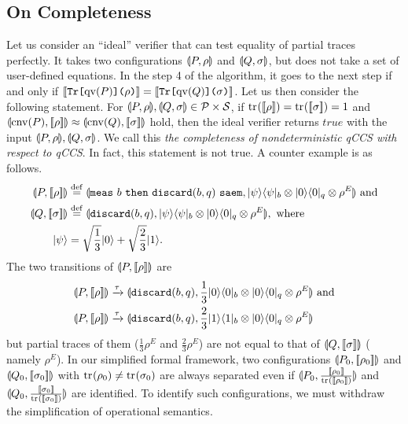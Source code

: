 \subsection{On Completeness}
Let us consider an ``ideal'' verifier that can test
equality of partial traces perfectly.
It takes two configurations
$\llparenthesis P, \rho \rrparenthesis$ and $\llparenthesis Q, \sigma \rrparenthesis$, but does not take a
set of user-defined equations. In the step 4 of the algorithm,
it goes to the next step 
if and only if $[\![\texttt{Tr[}\mathrm{qv}(P)\texttt{](}\rho\texttt{)}]\!] =
[\![\texttt{Tr[}\mathrm{qv}(Q)\texttt{](}\sigma\texttt{)}]\!]$.
Let us then consider the following statement.
For $\llparenthesis P, \rho \rrparenthesis,\llparenthesis Q, \sigma \rrparenthesis \in \mathcal{P} \times \mathcal{S}$,
if ${\rm tr}_{}([\![\rho]\!])={\rm tr}_{}([\![\sigma]\!])=1$ and
$\llparenthesis \mathrm{cnv}(P), [\![\rho]\!] \rrparenthesis \approx
\llparenthesis \mathrm{cnv}(Q), [\![\sigma]\!] \rrparenthesis$ hold, then
the ideal verifier returns $\mathit{true}$ with
the input $\llparenthesis P, \rho \rrparenthesis,\llparenthesis Q, \sigma \rrparenthesis$.
We call this
\emph{the completeness of nondeterministic qCCS with respect to qCCS}.
In fact, this statement is not true.
A counter example is as follows.
\begin{align*}
 \llparenthesis P, [\![\rho]\!] \rrparenthesis &\overset{\mathrm{def}}{=} \llparenthesis {\tt meas}~b~{\tt then}~\mathtt{discard(} b,q \mathtt{)}~{\tt saem}, |\psi\rangle\langle \psi|_b \otimes |0\rangle\langle 0|_q \otimes \rho^E \rrparenthesis \mbox{ and}
\\
 \llparenthesis Q, [\![\sigma]\!] \rrparenthesis &\overset{\mathrm{def}}{=} \llparenthesis \mathtt{discard(} b,q \mathtt{)}, |\psi\rangle\langle \psi|_b \otimes |0\rangle\langle 0|_q \otimes \rho^E \rrparenthesis,
 \mbox{ where}\\
 |\psi\rangle &= \sqrt{\frac{1}{3}}|0\rangle + \sqrt{\frac{2}{3}}|1\rangle.
\end{align*}
The two transitions of $\llparenthesis P, [\![\rho]\!] \rrparenthesis$ are
\begin{align*}
 \llparenthesis P, [\![\rho]\!] \rrparenthesis &\xrightarrow{\tau} \llparenthesis \mathtt{discard(} b,q \mathtt{)}, \frac{1}{3}|0\rangle\langle 0|_b \otimes |0\rangle\langle 0|_q \otimes \rho^E \rrparenthesis
 \mbox{ and}\\
 \llparenthesis P, [\![\rho]\!] \rrparenthesis &\xrightarrow{\tau} \llparenthesis \mathtt{discard(} b,q \mathtt{)}, \frac{2}{3}|1\rangle\langle 1|_b \otimes |0\rangle\langle 0|_q \otimes \rho^E \rrparenthesis
\end{align*}
but partial traces of them ($\frac{1}{3}\rho^E$ and 
$\frac{2}{3}\rho^E$) are not equal to that of $\llparenthesis Q, [\![\sigma]\!] \rrparenthesis$ (
namely $\rho^E$). In our simplified formal framework,
two configurations $\llparenthesis P_0, [\![\rho_0]\!] \rrparenthesis$ and $\llparenthesis Q_0, [\![\sigma_0]\!] \rrparenthesis$
with ${\rm tr}_{}(\rho_0) \neq {\rm tr}_{}(\sigma_0)$ are always separated even if
$\llparenthesis P_0, \frac{[\![\rho_0]\!]}{{\rm tr}_{}([\![\rho_0]\!])} \rrparenthesis$ and
$\llparenthesis Q_0, \frac{[\![\sigma_0]\!]}{{\rm tr}_{}([\![\sigma_0]\!])} \rrparenthesis$ are identified.
To identify such configurations, we must withdraw the simplification of 
operational semantics.

